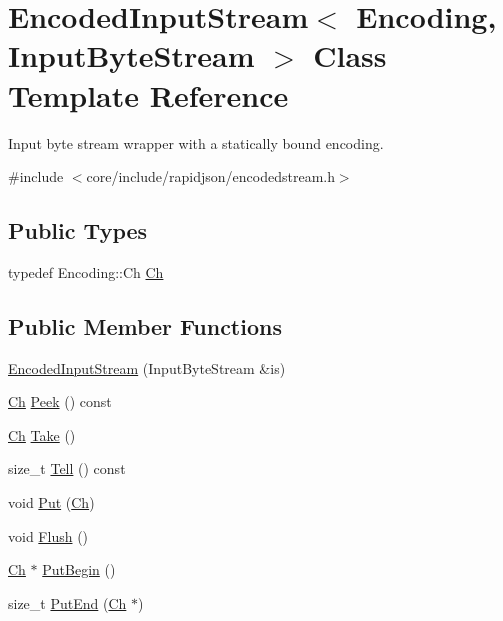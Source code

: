 \hypertarget{classEncodedInputStream}{}\section{Encoded\+Input\+Stream$<$ Encoding, Input\+Byte\+Stream $>$ Class Template Reference}
\label{classEncodedInputStream}


Input byte stream wrapper with a statically bound encoding.  




{\ttfamily \#include $<$core/include/rapidjson/encodedstream.\+h$>$}

\subsection*{Public Types}
\begin{DoxyCompactItemize}
\item 
typedef Encoding\+::\+Ch \hyperlink{classEncodedInputStream_acc387a1364390da244bbb1ab07bdceca}{Ch}
\end{DoxyCompactItemize}
\subsection*{Public Member Functions}
\begin{DoxyCompactItemize}
\item 
\hyperlink{classEncodedInputStream_a17f8e629500f6ae71cb72d1d63bf41fd}{Encoded\+Input\+Stream} (Input\+Byte\+Stream \&is)
\item 
\hyperlink{classEncodedInputStream_acc387a1364390da244bbb1ab07bdceca}{Ch} \hyperlink{classEncodedInputStream_abda3b0c141254343f4c481f67d52b423}{Peek} () const 
\item 
\hyperlink{classEncodedInputStream_acc387a1364390da244bbb1ab07bdceca}{Ch} \hyperlink{classEncodedInputStream_ab42cd57581bf62e42af471583e5b8377}{Take} ()
\item 
size\+\_\+t \hyperlink{classEncodedInputStream_a34cdb99fd81cd211f71903348e9c986f}{Tell} () const 
\item 
void \hyperlink{classEncodedInputStream_afea36b666a44bd4adeabfcab7b68a322}{Put} (\hyperlink{classEncodedInputStream_acc387a1364390da244bbb1ab07bdceca}{Ch})
\item 
void \hyperlink{classEncodedInputStream_aa4415bf4b97dd01e8c3de0ad7a161724}{Flush} ()
\item 
\hyperlink{classEncodedInputStream_acc387a1364390da244bbb1ab07bdceca}{Ch} $\ast$ \hyperlink{classEncodedInputStream_ad97f7a549a8622c61b7fb2c63fedd69b}{Put\+Begin} ()
\item 
size\+\_\+t \hyperlink{classEncodedInputStream_a83fe5ed281413d6005d1b324730e8bed}{Put\+End} (\hyperlink{classEncodedInputStream_acc387a1364390da244bbb1ab07bdceca}{Ch} $\ast$)
\end{DoxyCompactItemize}


